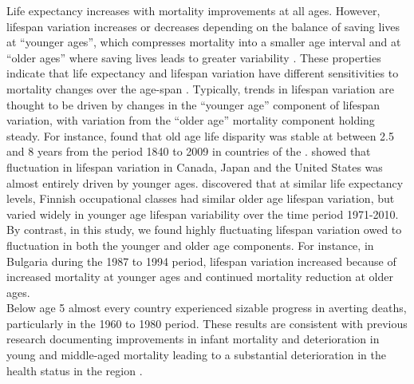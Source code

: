 \documentclass{article}
\begin{document}
\begin{spacing}{1.5}
Life expectancy increases with mortality improvements at all ages. However, lifespan variation increases or decreases depending on the balance of saving lives at ``younger ages'', which compresses mortality into a smaller age interval and at ``older ages'' where saving lives leads to greater variability \citep{zhang2009, gillespie2014divergence}. These properties indicate that life expectancy and lifespan variation have different sensitivities to mortality changes over the age-span \citep{vanraalte2013}. Typically, trends in lifespan variation are thought to be driven by changes in the ``younger age'' component of lifespan variation, with variation from the ``older age'' mortality component holding steady. For instance, \citet{vaupel2011} found that old age life disparity was stable at between 2.5 and 8 years from the period 1840 to 2009 in countries of the \cite{HMD}. \citet{gillespie2014divergence} showed that fluctuation in lifespan variation in Canada, Japan and the United States was almost entirely driven by younger ages. \citet{vanraalte2014} discovered that at similar life expectancy levels, Finnish occupational classes had similar older age lifespan variation, but varied widely in younger age lifespan variability over the time period 1971-2010.  By contrast, in this study, we found highly fluctuating lifespan variation owed to fluctuation in both the younger and older age components. For instance, in Bulgaria during the 1987 to 1994 period, lifespan variation increased because of increased mortality at younger ages and continued mortality reduction at older ages.\\

Below age 5 almost every country experienced sizable progress in averting deaths, particularly in the 1960 to 1980 period. These results are consistent with previous research documenting improvements in infant mortality and deterioration in young and middle-aged mortality leading to a substantial deterioration in the health status in the region \citep{chenet1996}. \\


\end{spacing}
\end{document}
